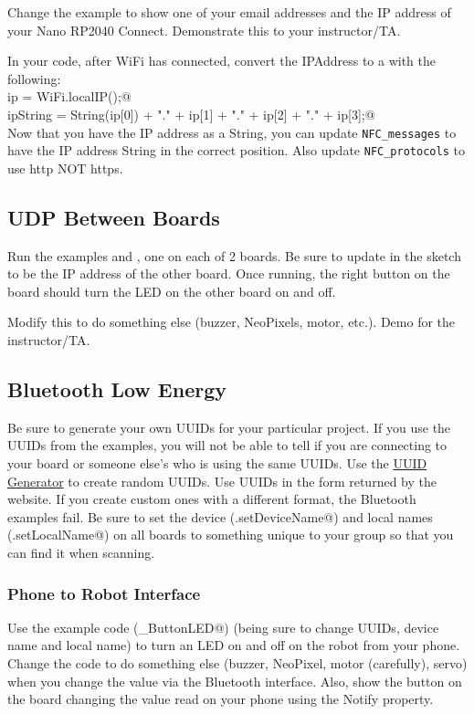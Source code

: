 Change the example to show one of your email addresses and the IP address of your 
Nano RP2040 Connect. Demonstrate this to your instructor/TA.

In your code, after WiFi has connected, convert the IPAddress to a \lstinline@String@ 
with the following:\\
\lstinline@IPAddress ip = WiFi.localIP();@\\
\lstinline@String ipString = String(ip[0]) + "." + ip[1] + "." + ip[2] + "." + ip[3];@\\
Now that you have the IP address as a String, you can update \lstinline|NFC_messages| to 
have the IP address String in the correct position. Also update \lstinline|NFC_protocols| 
to use http NOT https.


\subsection{UDP Between Boards}
Run the examples \lstinline@WiFiUdpSend@ and \lstinline@WiFiUdpReceiveSend@, one 
on each of 2 boards. Be sure to update \lstinline@remoteIp@ in the 
\lstinline@WiFiUdpSend@ sketch to be the IP address of the other board. Once 
running, the right button on the \lstinline@@ board should turn the LED on 
the other board on and off.

Modify this to do something else (buzzer, NeoPixels, motor, etc.). Demo for the 
instructor/TA.

\subsection{Bluetooth Low Energy}
Be sure to generate your own UUIDs for your particular project. If you use
the UUIDs from the examples, you will not be able to tell if you are connecting
to your board or someone else's who is using the same UUIDs. Use the 
\href{https://www.uuidgenerator.net/}{UUID Generator} to create random UUIDs.
Use UUIDs in the form returned by the website. If you create custom ones with 
a different format, the Bluetooth examples fail.
Be sure to set the device (\lstinline@BLE.setDeviceName@) and local names 
(\lstinline@BLE.setLocalName@) on all boards to something unique to 
your group so that you can find it when scanning.

\subsubsection{Phone to Robot Interface}
Use the example code (\lstinline@BLE_ButtonLED@) (being sure to change UUIDs, device name and local name)
to turn an LED on and off on the robot from your phone. Change the code to 
do something else (buzzer, NeoPixel, motor (carefully), servo) when you change 
the value via the Bluetooth interface. Also, show the button on the board changing
the value read on your phone using the Notify property.

